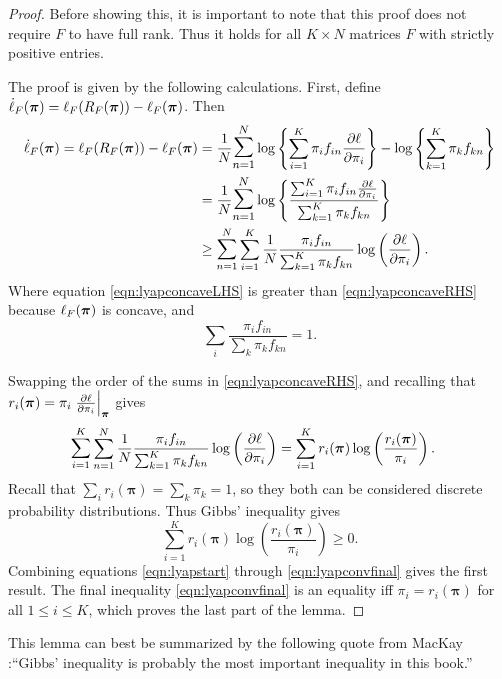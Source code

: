 \begin{proof}
	Before showing this, it is important to note that this proof does not require \( F \) to have full rank. Thus it holds for all \( K\times N \) matrices \( F \) with strictly positive entries.
	
	The proof is given by the following calculations. First, define \( \dot{\ell}_F(\bm\pi) = \ell_{F}(R_F(\bm\pi))-\ell_{F}({\bm\pi}) \). Then
	\begin{align}
	\dot{\ell}_F(\bm\pi) = \ell_{F}(R_F(\bm\pi))-\elpi{F} &= \frac{1}{N}\mathlarger{\mathlarger{\sum}_{n=1}^{N}} \log\left\{\sum_{i=1}^{K}\pi_if_{in}\pdv{\ell}{\pi_i}\right\} - \log\left\{\sum_{k=1}^{K}\pi_kf_{kn}\right\} \label{eqn:lyapstart}\\
	&=\frac{1}{N}\mathlarger{\mathlarger{\sum}_{n=1}^{N}}\log\left\{\frac{\sum_{i=1}^{K}\pi_if_{in}\pdv{\ell}{\pi_i}}{\sum_{k=1}^{K}\pi_kf_{kn}}\right\} \label{eqn:lyapconcaveLHS}\\
	&\geq\mathlarger{\sum}_{n=1}^{N}\sum_{i=1}^{K}\frac 1N \frac{\pi_if_{in}} {\sum_{k=1}^{K}\pi_kf_{kn}} \log\left(\pdv{\ell}{\pi_i}\right).\label{eqn:lyapconcaveRHS}
	\end{align}
	Where equation \eqref{eqn:lyapconcaveLHS} is greater than \eqref{eqn:lyapconcaveRHS} because \( \ell_{F}({\bm\pi}) \) is concave, and 
	\[ \sum_{i}\frac{\pi_if_{in}}{\sum_{k}\pi_kf_{kn}} =1. \]
	
	Swapping the order of the sums in \eqref{eqn:lyapconcaveRHS}, and recalling that \( r_i(\bm\pi) = \pi_i\eval{\pdv{\ell}{\pi_i}}_{\bm\pi}\) gives
	\begin{align}
	\mathlarger{\sum}_{i=1}^{K}\sum_{n=1}^{N}\frac 1N \frac{\pi_if_{in}} {\sum_{k=1}^{K}\pi_kf_{kn}} \log\left(\pdv{\ell}{\pi_i}\right)&= \sum_{i=1}^{K}r_i(\bm\pi)\log\left(\frac{r_i(\bm\pi)}{\pi_i}\right). \label{eqn:lyapconv2kldiv}
	\end{align}
	Recall that \( \sum_i r_i(\bm\pi) =\sum_k\pi_k=1\), so they both can be considered discrete probability distributions. Thus Gibbs' inequality \cite[\S 2.6]{MacKay2002} gives
	\begin{equation}\label{eqn:lyapconvfinal}
	\sum_{i=1}^{K}r_i(\bm\pi)\log\left(\frac{r_i(\bm\pi)}{\pi_i}\right)\geq 0. 
	\end{equation}
	Combining equations \eqref{eqn:lyapstart} through \eqref{eqn:lyapconvfinal} gives the first result. The final inequality \eqref{eqn:lyapconvfinal} is an equality iff \( \pi_i = r_i(\bm\pi) \) for all \( 1\leq i\leq K \), which proves the last part of the lemma.
\end{proof}
This lemma can best be summarized by the following quote from MacKay \cite[\S 2.6]{MacKay2002}:``Gibbs’ inequality is probably the most important inequality in this book.''

